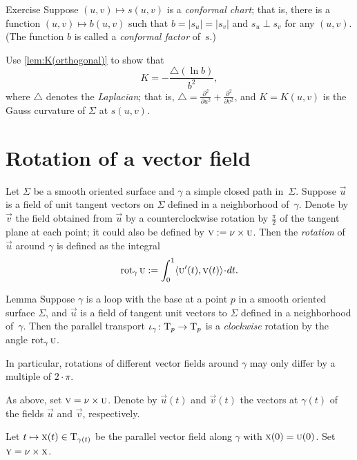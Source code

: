 \begin{thm}{Exercise}\label{ex:conformal}
Suppose $(u,v)\mapsto s(u,v)$ is a \emph{conformal chart};
that is, there is a function $(u,v)\mapsto b(u,v)$ such that $b=|s_u|=|s_v|$ and $s_u\perp s_v$ for any $(u,v)$.
(The function $b$ is called a {}\emph{conformal factor} of~$s$.)

Use \ref{lem:K(orthogonal)} to show that  
\[K=-\frac{\triangle (\ln b)}{b^2},\]
where $\triangle$ denotes the \emph{Laplacian}; that is, $\triangle=\tfrac{\partial^2}{\partial u^2}+\tfrac{\partial^2}{\partial v^2}$, and 
 $K=K(u,v)$ is the Gauss curvature of $\Sigma$ at $s(u,v)$.
\end{thm}

\section{Rotation of a vector field}

Let $\Sigma$ be a smooth oriented surface and $\gamma$ a simple closed path in~$\Sigma$.
Suppose $\vec u$ is a field of unit tangent vectors on $\Sigma$ defined in a neighborhood of~$\gamma$.
Denote by $\vec v$ the field obtained from $\vec u$ by a counterclockwise rotation by $\tfrac{\pi}2$ of the tangent plane at each point; it could also be defined by $\text{\sc{v}}\mathrel{:=}\nu\times\text{\sc{u}}$.
Then the \emph{rotation} of $\vec u$ around $\gamma$ is defined as the integral
\[\rot_\gamma\vec u
\df
\int_0^1\langle\vec u'(t),\vec v(t)\rangle\cdot dt.\]

\begin{thm}{Lemma}\label{lem:rotation-parallel}
Suppose $\gamma$ is a loop with the base at a point $p$ in a smooth oriented surface $\Sigma$, and $\vec u$ is a field of tangent unit vectors to $\Sigma$ defined in a neighborhood of~$\gamma$.
Then the parallel transport $\iota_\gamma\colon\mathrm{T}_p\to\mathrm{T}_p$ is a {}\emph{clockwise} rotation by the angle $\mathop{\rm rot}\nolimits_\gamma\text{\sc{u}}$.

In particular, rotations of different vector fields around $\gamma$ may only differ by a multiple of $2\cdot\pi$.
\end{thm}

As above, set $\text{\sc{v}}=\nu\times\text{\sc{u}}$. 
Denote by $\vec u(t)$ and $\vec v(t)$ the vectors at $\gamma(t)$ of the fields $\vec u$ and $\vec v$, respectively.

Let $t\mapsto \text{\sc{x}}(t)\in \mathrm{T}_{\gamma(t)}$ be the parallel vector field along $\gamma$ with  $\vec x(0)\z=\vec u(0)$.
Set $\text{\sc{y}}=\nu\times\text{\sc{x}}$.

